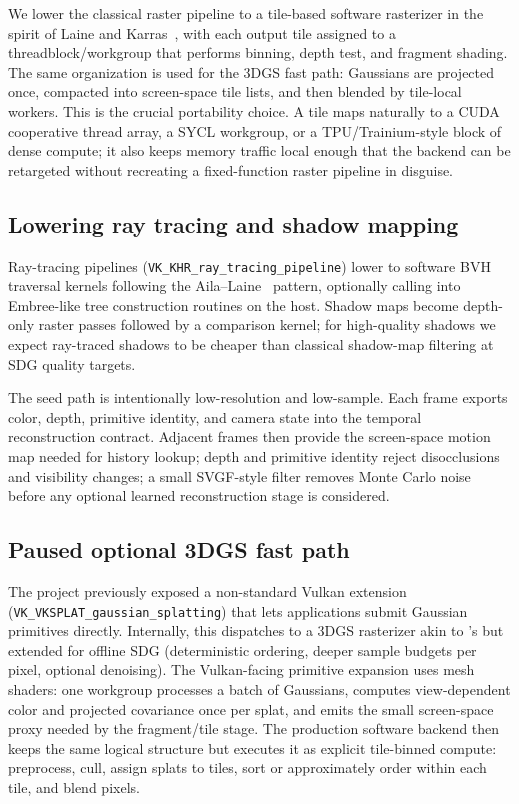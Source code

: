 \documentclass[10pt,journal]{IEEEtran}
\begin{document}
We lower the classical raster pipeline to a tile-based software
rasterizer in the spirit of Laine and
Karras~\cite{laine2011software}, with each output tile assigned to a
threadblock\slash workgroup that performs binning, depth test, and
fragment shading. The same organization is used for the 3DGS fast path:
Gaussians are projected once, compacted into screen-space tile lists,
and then blended by tile-local workers. This is the crucial portability
choice. A tile maps naturally to a CUDA cooperative thread array, a SYCL
workgroup, or a TPU/Trainium-style block of dense compute; it also keeps
memory traffic local enough that the backend can be retargeted without
recreating a fixed-function raster pipeline in disguise.

\subsection{Lowering ray tracing and shadow mapping}

Ray-tracing pipelines (\texttt{VK\_KHR\_ray\_tracing\_pipeline}) lower to
software BVH traversal kernels following the
Aila--Laine~\cite{aila2009understanding} pattern, optionally calling
into Embree-like tree construction routines on the host. Shadow maps
become depth-only raster passes followed by a comparison kernel; for
high-quality shadows we expect ray-traced shadows to be cheaper than
classical shadow-map filtering at SDG quality targets.

The seed path is intentionally low-resolution and low-sample. Each
frame exports color, depth, primitive identity, and camera state into
the temporal reconstruction contract. Adjacent frames then provide the
screen-space motion map needed for history lookup; depth and primitive
identity reject disocclusions and visibility changes; a small
SVGF-style filter removes Monte Carlo noise before any optional learned
reconstruction stage is considered.

\subsection{Paused optional 3DGS fast path}\label{sec:v1}

The project previously exposed a non-standard Vulkan extension
(\texttt{VK\_VKSPLAT\_gaussian\_splatting}) that lets applications submit
Gaussian primitives directly. Internally, this dispatches to a
3DGS rasterizer akin to \cite{kerbl20233dgs}'s but extended for offline
SDG (deterministic ordering, deeper sample budgets per pixel, optional
denoising). The Vulkan-facing primitive expansion uses mesh shaders:
one workgroup processes a batch of Gaussians, computes view-dependent
color and projected covariance once per splat, and emits the small
screen-space proxy needed by the fragment/tile stage. The production
software backend then keeps the same logical structure but executes it
as explicit tile-binned compute: preprocess, cull, assign splats to
tiles, sort or approximately order within each tile, and blend pixels.
\end{document}
